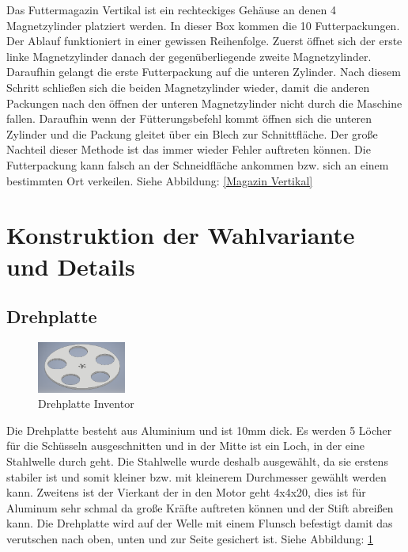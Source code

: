 Das Futtermagazin Vertikal ist ein rechteckiges Gehäuse an denen 4 Magnetzylinder platziert werden. In dieser Box kommen die 10 Futterpackungen. Der Ablauf funktioniert in einer gewissen Reihenfolge. Zuerst öffnet sich der erste linke Magnetzylinder danach der gegenüberliegende zweite Magnetzylinder. Daraufhin gelangt die erste Futterpackung auf die unteren Zylinder. Nach diesem Schritt schließen sich die beiden Magnetzylinder wieder, damit die anderen Packungen nach den öffnen der unteren Magnetzylinder nicht durch die Maschine fallen. Daraufhin wenn der Fütterungsbefehl kommt öffnen sich die unteren Zylinder und die Packung gleitet über ein Blech zur Schnittfläche. Der große Nachteil dieser Methode ist das immer wieder Fehler auftreten können. Die Futterpackung kann falsch an der Schneidfläche ankommen bzw. sich an einem bestimmten Ort verkeilen. Siehe Abbildung: \ref{Magazin Vertikal}

\section{Konstruktion der Wahlvariante und Details}

\subsection{Drehplatte}

\begin{figure}
\vspace{-40pt}
  \begin{center}
    \includegraphics[width=0.26\textwidth]{Bilder/Inventor/Drehplatte}
  \end{center}
  \caption{Drehplatte Inventor}
  \label{Drehplatte_Inventor}
  \vspace{-10pt}
\end{figure}

Die Drehplatte besteht aus Aluminium und ist 10mm dick. Es werden 5 Löcher für die Schüsseln ausgeschnitten und in der Mitte ist ein Loch, in der eine Stahlwelle durch geht. Die Stahlwelle wurde deshalb ausgewählt, da sie erstens stabiler ist und somit kleiner bzw. mit kleinerem Durchmesser gewählt werden kann. Zweitens ist der Vierkant der in den Motor geht 4x4x20, dies ist für Aluminum sehr schmal da große Kräfte auftreten können und der Stift abreißen kann. Die Drehplatte wird auf der Welle mit einem Flunsch befestigt damit das verutschen nach oben, unten und zur Seite gesichert ist. Siehe Abbildung: \ref{Drehplatte_Inventor}

